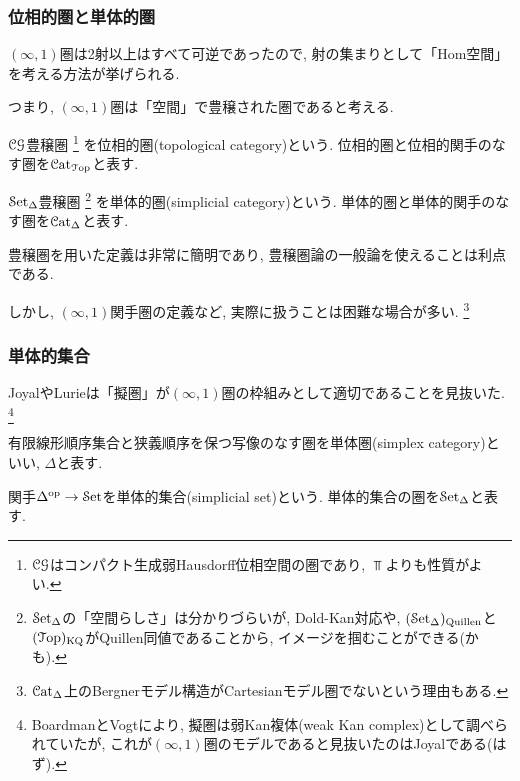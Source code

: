 \documentclass[aspectratio=169, dvipdfmx, 8pt, notheorems, uplatex]{beamer}
\begin{document}
\begin{frame}
  \frametitle{位相的圏と単体的圏}

  $(\infty,1)$圏は2射以上はすべて可逆であったので, 射の集まりとして「Hom空間」を考える方法が挙げられる. 
  
  つまり, $(\infty,1)$圏は「空間」で豊穣された圏であると考える. 


  \begin{definition}[位相的圏]
    $\mathcal{CG}$豊穣圏
    \footnote{
      $\mathcal{CG}$はコンパクト生成弱Hausdorff位相空間の圏であり, $\Top$よりも性質がよい. 
    }
    を位相的圏(topological category)という. 
    位相的圏と位相的関手のなす圏を$\mathcal{C}\mathrm{at}_{\mathcal{T}\mathrm{op}}$と表す. 
  \end{definition}

  \begin{definition}[単体的圏]
    $\mathcal{S}\mathrm{et}_{\Delta}$豊穣圏
    \footnote{
      $\mathcal{S}\mathrm{et}_{\Delta}$の「空間らしさ」は分かりづらいが, Dold-Kan対応や, $(\mathcal{S}\mathrm{et}_{\Delta})_{\mathrm{Quillen}}$と$(\mathcal{T}\mathrm{op})_{\mathrm{KQ}}$がQuillen同値であることから, イメージを掴むことができる(かも). 
    }
    を単体的圏(simplicial category)という. 
    単体的圏と単体的関手のなす圏を$\mathcal{C}\mathrm{at}_\Delta$と表す. 
  \end{definition}

  豊穣圏を用いた定義は非常に簡明であり, 豊穣圏論の一般論を使えることは利点である. 

  しかし, $(\infty,1)$関手圏の定義など, 実際に扱うことは困難な場合が多い. 
  \footnote{
    $\mathcal{C}\mathrm{at}_\Delta$上のBergnerモデル構造がCartesianモデル圏でないという理由もある. 
  }

\end{frame}


\begin{frame}
  \frametitle{単体的集合}

  JoyalやLurieは「擬圏」が$(\infty,1)$圏の枠組みとして適切であることを見抜いた. 
  \footnote{
    BoardmanとVogtにより, 擬圏は弱Kan複体(weak Kan complex)として調べられていたが, これが$(\infty,1)$圏のモデルであると見抜いたのはJoyalである(はず).
  }

  \begin{definition}[単体圏]
    有限線形順序集合と狭義順序を保つ写像のなす圏を単体圏(simplex category)といい, $\Delta$と表す. 
  \end{definition}

  \begin{definition}[単体的集合]
    関手$\Delta^{\mathrm{op}} \to \mathcal{S}\mathrm{et}$を単体的集合(simplicial set)という. 
    単体的集合の圏を$\mathcal{S}\mathrm{et}_{\Delta}$と表す. 
  \end{definition}

\end{frame}
\end{document}
